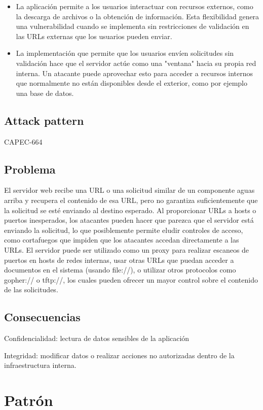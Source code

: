 \begin{itemize}
    \item La aplicación permite a los usuarios interactuar con recursos externos, como la descarga de archivos o la obtención de información. Esta flexibilidad genera una vulnerabilidad cuando se implementa sin restricciones de validación en las URLs externas que los usuarios pueden enviar.
    \item La implementación que permite que los usuarios envíen solicitudes sin validación hace que el servidor actúe como una "ventana" hacia su propia red interna. Un atacante puede aprovechar esto para acceder a recursos internos que normalmente no están disponibles desde el exterior, como por ejemplo una base de datos. 
\end{itemize}

\subsection*{Attack pattern}
CAPEC-664
\subsection*{Problema}

El servidor web recibe una URL o una solicitud similar de un componente aguas arriba y recupera el contenido de esa URL, pero no garantiza suficientemente que la solicitud se esté enviando al destino esperado.
Al proporcionar URLs a hosts o puertos inesperados, los atacantes pueden hacer que parezca que el servidor está enviando la solicitud, lo que posiblemente permite eludir controles de acceso, como cortafuegos que impiden que los atacantes accedan directamente a las URLs. El servidor puede ser utilizado como un proxy para realizar escaneos de puertos en hosts de redes internas, usar otras URLs que puedan acceder a documentos en el sistema (usando file://), o utilizar otros protocolos como gopher:// o tftp://, los cuales pueden ofrecer un mayor control sobre el contenido de las solicitudes.

\subsection*{Consecuencias}

Confidencialidad: lectura de datos sensibles de la aplicación

Integridad: modificar datos o realizar acciones no autorizadas dentro de la infraestructura interna.

\section{Patrón}
